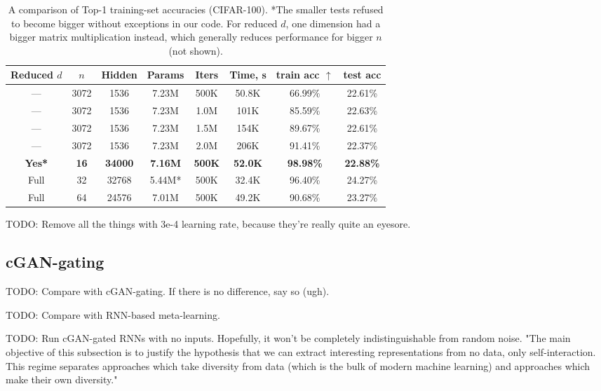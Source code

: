 \documentclass{article}
\begin{document}
\begin{table}
\begin{center}
\begin{tabular}{cccccccc}
\hline
Reduced $d$ & $n$ & Hidden & Params & Iters & Time, s & train acc $\uparrow$ & test acc \\
\hline
--- & 3072 & 1536 & 7.23M & 500K & 50.8K & 66.99\% & 22.61\% \\
--- & 3072 & 1536 & 7.23M & 1.0M & 101K & 85.59\% & 22.63\% \\
--- & 3072 & 1536 & 7.23M & 1.5M & 154K & 89.67\% & 22.61\% \\
--- & 3072 & 1536 & 7.23M & 2.0M & 206K & 91.41\% & 22.37\% \\
\hline
\textbf{Yes*} & \textbf{16} & \textbf{34000} & \textbf{7.16M} & \textbf{500K} & \textbf{52.0K} & \textbf{98.98\%} & \textbf{22.88\%} \\
Full & 32 & 32768 & 5.44M* & 500K & 32.4K & 96.40\% & 24.27\% \\
Full & 64 & 24576 & 7.01M & 500K & 49.2K & 90.68\% & 23.27\% \\
\hline
\end{tabular}
\end{center}
\caption{A comparison of Top-1 training-set accuracies (CIFAR-100). *The smaller tests refused to become bigger without exceptions in our code. For reduced $d$, one dimension had a bigger matrix multiplication instead, which generally reduces performance for bigger $n$ (not shown).}
\label{LDLimages}
\end{table}

    TODO: Remove all the things with 3e-4 learning rate, because they're really quite an eyesore.

\subsection{cGAN-gating}

    TODO: Compare with cGAN-gating. If there is no difference, say so (ugh).

    TODO: Compare with RNN-based meta-learning.

    TODO: Run cGAN-gated RNNs with no inputs. Hopefully, it won't be completely indistinguishable from random noise. "The main objective of this subsection is to justify the hypothesis that we can extract interesting representations from no data, only self-interaction. This regime separates approaches which take diversity from data (which is the bulk of modern machine learning) and approaches which make their own diversity."
\end{document}
